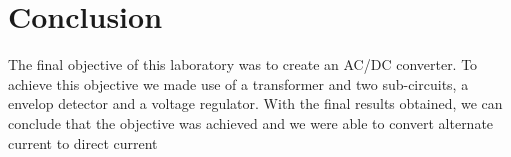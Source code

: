 \section{Conclusion}
\label{sec:conclusion}

The final objective of this laboratory was to create an AC/DC converter.
To achieve this objective we made use of a transformer and two sub-circuits, a envelop detector and a voltage regulator.
With the final results obtained, we can conclude that the objective was achieved and we were able to convert alternate current to direct current
